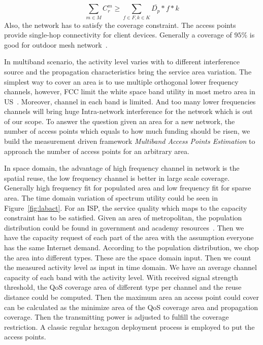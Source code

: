 \begin{equation}
\label{eq:nlbound}
\sum_{m \in M}C_r^m \ge \sum_{f \in F,k \in K}\bar{D_p}*f*k
\end{equation}
Also, the network has to satisfy the coverage constraint. The access points provide 
single-hop connectivity for client devices. 
Generally a coverage of $95\%$ is good for outdoor mesh network~\cite{robinson2010deploying}.

In multiband scenario, the activity level varies with to different interference source and the propagation
characteristics bring the service area variation. The simplest way to cover an area is to use 
multiple orthogonal lower frequency channels, however, FCC limit the white space band utility in 
most metro area in US~\cite{googledatabase}. Moreover, channel in each band is limited. 
And too many lower frequencies channels will bring huge Intra-network interference for 
the network which is out of our scope. To answer the question given an area for a new network, 
the number of access points which equals to how much funding should be risen, we build the measurement driven
framework {\it Multiband Access Points Estimation} to approach the number of access points for
an arbitrary area.


In space domain, the advantage of high frequency channel in network is the spatial reuse, the low
frequency channel is better in large scale coverage. Generally high frequency fit
for populated area and low frequency fit for sparse area.
The time domain variation of spectrum utility could be seen in Figure~\ref{fig:labact}.
For an ISP, the service quality which maps to the capacity constraint has to be satisfied.
Given an area of metropolitan, the population distribution could be found in 
government and academy resources~\cite{uscensus}. Then we have the capacity request
of each part of the area with the assumption everyone has the same Internet demand. 
According to the population distribution, we chop the area into different types.
These are the space domain input. Then we count the measured activity level as 
input in time domain. We have an average channel capacity of each band with the 
activity level. With received signal strength threshold, 
the QoS coverage area of different type per channel and the reuse distance could be computed. 
Then the maximum area an access point could cover can be calculated as the minimize 
area of the QoS coverage area and propagation coverage.
Then the transmitting power is adjusted to fulfill the coverage restriction. 
A classic regular hexagon deployment process is employed to put the access points.

